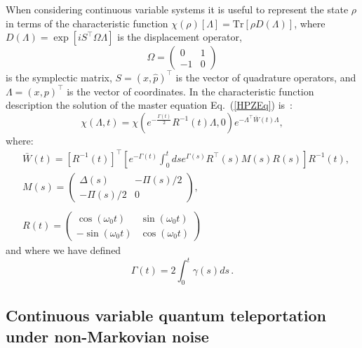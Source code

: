 \documentclass[prl,twocolumn,aps,floatfix,showpacs,tightenlines,superscriptaddress,amsmath,amssymb,amsfonts,10pt]{revtex4-1}
\begin{document}
When considering continuous variable systems it is useful to represent the state $\rho$ in terms of the characteristic function $\chi(\rho)[\Lambda]=\textrm{Tr}[\rho D(\Lambda)]$, where $D(\Lambda)=\exp[i S^\intercal \Omega\Lambda]$ is the displacement operator,
\begin{equation}
\Omega=\left(\begin{array}{cc}\label{SympMat}
0 & 1 \\
-1 & 0
\end{array} \right)
\end{equation}
is the symplectic matrix, $S=(\hat{x},\hat{p})^\intercal$ is the vector of quadrature operators, and $\Lambda=(x,p)^\intercal$ is the vector of coordinates. In the characteristic function description the solution of the master equation Eq.~(\ref{HPZEq}) is~\cite{PhysRevA.67.042108, PhysRevA.70.032113}:
\begin{equation}\label{chiEvol}
\chi(\Lambda, t)=\chi(e^{-\frac{\Gamma(t)}{2}}R^{-1}(t)\Lambda, 0)e^{-\Lambda^\intercal \bar{W}(t)\Lambda},
\end{equation}
where:
\begin{align}
&\bar{W}(t)\!=\![R^{-1}(t)]^\intercal\!\!\left[e^{-\Gamma(t)}\!\!\!\int_0^t \!\!ds e^{\Gamma(s)}R^\intercal(s) M(s) R(s)\right]\!\!R^{-1}(t), \label{WBAR}  \\
& M(s)\!=\!\left(\begin{array}{cc}
\Delta(s)& -\Pi(s)/2 \\
-\Pi(s)/2 & 0
\end{array} \right), \\
& \\ \nonumber
& R(t)=\left(\begin{array}{cc}
\cos(\omega_0 t)& \sin(\omega_0 t) \\
-\sin(\omega_0 t)& \cos(\omega_0 t)
\end{array} \right)\label{WBarMat}
\end{align}
and where we have defined
\begin{equation}
\Gamma(t)=2\int_0^t \gamma(s)ds \, .
\end{equation}

\subsection{Continuous variable quantum teleportation under non-Markovian noise}
\end{document}
